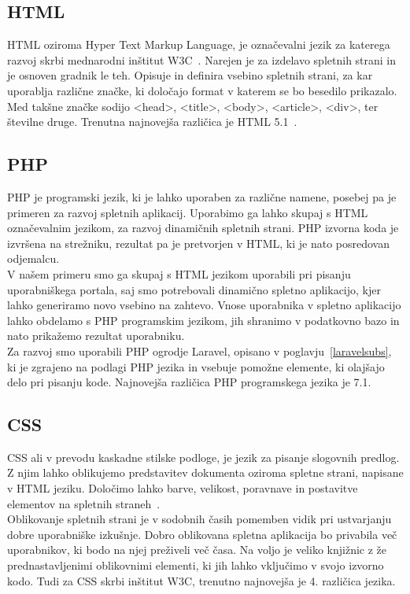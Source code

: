 \documentclass[a4paper, 12pt]{book}
\begin{document}
\subsection{HTML}
HTML oziroma Hyper Text Markup Language, je označevalni jezik za katerega razvoj skrbi mednarodni inštitut W3C~\cite{w3c}. Narejen je za izdelavo spletnih strani in je osnoven gradnik le teh. Opisuje in definira vsebino spletnih strani, za kar uporablja različne značke, ki določajo format v katerem se bo besedilo prikazalo. Med takšne značke sodijo \textless head\textgreater, \textless title\textgreater, \textless body\textgreater, \textless article\textgreater, \textless div\textgreater, ter številne druge. Trenutna najnovejša različica je HTML 5.1~\cite{html}.
\subsection{PHP}
PHP je programski jezik, ki je lahko uporaben za različne namene, posebej pa je primeren za razvoj spletnih aplikacij. Uporabimo ga lahko skupaj s HTML označevalnim jezikom, za razvoj dinamičnih spletnih strani. PHP izvorna koda je izvršena na strežniku, rezultat pa je pretvorjen v HTML, ki je nato posredovan odjemalcu.\\V našem primeru smo ga skupaj s HTML jezikom uporabili pri pisanju uporabniškega portala, saj smo potrebovali dinamično spletno aplikacijo, kjer lahko generiramo novo vsebino na zahtevo. Vnose uporabnika v spletno aplikacijo lahko obdelamo s PHP programskim jezikom, jih shranimo v podatkovno bazo in nato prikažemo rezultat uporabniku.\\Za razvoj smo uporabili PHP ogrodje Laravel, opisano v poglavju~\ref{laravelsubs}, ki je zgrajeno na podlagi PHP jezika in vsebuje pomožne elemente, ki olajšajo delo pri pisanju kode. Najnovejša različica PHP programskega jezika je 7.1.

\subsection{CSS}
CSS ali v prevodu kaskadne stilske podloge, je jezik za pisanje slogovnih predlog. Z njim lahko oblikujemo predstavitev dokumenta oziroma spletne strani, napisane v HTML jeziku. Določimo lahko barve, velikost, poravnave in postavitve elementov na spletnih straneh~\cite{css}.\\Oblikovanje spletnih strani je v sodobnih časih pomemben vidik pri ustvarjanju dobre uporabniške izkušnje. Dobro oblikovana spletna aplikacija bo privabila več uporabnikov, ki bodo na njej preživeli več časa. Na voljo je veliko knjižnic z že prednastavljenimi oblikovnimi elementi, ki jih lahko vključimo v svojo izvorno kodo. Tudi za CSS skrbi inštitut W3C, trenutno najnovejša je 4. različica jezika.
\end{document}
